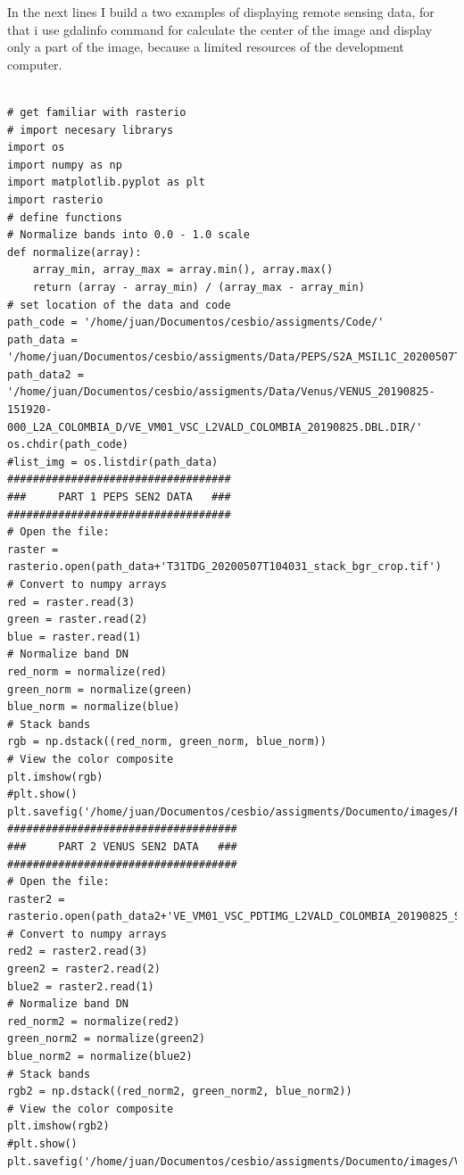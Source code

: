 \documentclass[a4paper,11pt]{article}
\theoremstyle{mytheor}
\begin{document}
In the next lines I build a two examples of displaying remote sensing data, for that i use gdalinfo command for calculate the center of the image and display only a part of the image, because a limited resources of the development computer.\\


\begin{lstlisting}[label={list:first},caption=Python code -- Display Remote Sensing Images.]

# get familiar with rasterio
# import necesary librarys
import os
import numpy as np
import matplotlib.pyplot as plt
import rasterio
# define functions
# Normalize bands into 0.0 - 1.0 scale
def normalize(array):
    array_min, array_max = array.min(), array.max()
    return (array - array_min) / (array_max - array_min)
# set location of the data and code
path_code = '/home/juan/Documentos/cesbio/assigments/Code/'
path_data = '/home/juan/Documentos/cesbio/assigments/Data/PEPS/S2A_MSIL1C_20200507T104031_N0209_R008_T31TDG_20200507T124549.SAFE/GRANULE/L1C_T31TDG_A025459_20200507T104558/IMG_DATA/'
path_data2 = '/home/juan/Documentos/cesbio/assigments/Data/Venus/VENUS_20190825-151920-000_L2A_COLOMBIA_D/VE_VM01_VSC_L2VALD_COLOMBIA_20190825.DBL.DIR/'
os.chdir(path_code)
#list_img = os.listdir(path_data)
###################################
###     PART 1 PEPS SEN2 DATA   ###
###################################
# Open the file:
raster = rasterio.open(path_data+'T31TDG_20200507T104031_stack_bgr_crop.tif')
# Convert to numpy arrays
red = raster.read(3)
green = raster.read(2)
blue = raster.read(1)
# Normalize band DN
red_norm = normalize(red)
green_norm = normalize(green)
blue_norm = normalize(blue)
# Stack bands
rgb = np.dstack((red_norm, green_norm, blue_norm))
# View the color composite
plt.imshow(rgb)
#plt.show()
plt.savefig('/home/juan/Documentos/cesbio/assigments/Documento/images/PEPS_show.png')
####################################
###     PART 2 VENUS SEN2 DATA   ###
####################################
# Open the file:
raster2 = rasterio.open(path_data2+'VE_VM01_VSC_PDTIMG_L2VALD_COLOMBIA_20190825_SRE_crop.DBL.TIF')
# Convert to numpy arrays
red2 = raster2.read(3)
green2 = raster2.read(2)
blue2 = raster2.read(1)
# Normalize band DN
red_norm2 = normalize(red2)
green_norm2 = normalize(green2)
blue_norm2 = normalize(blue2)
# Stack bands
rgb2 = np.dstack((red_norm2, green_norm2, blue_norm2))
# View the color composite
plt.imshow(rgb2)
#plt.show()
plt.savefig('/home/juan/Documentos/cesbio/assigments/Documento/images/VENUS_show.png')
\end{lstlisting} 
\end{document}
